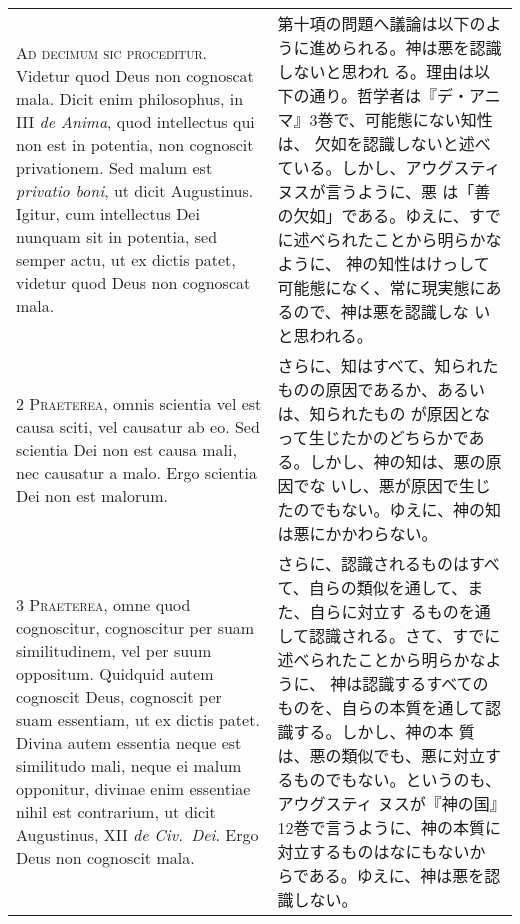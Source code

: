 \documentclass[10pt]{jsarticle} %
\begin{document}
\begin{longtable}{p{21em}p{21em}}



{\huge A}{\scshape d decimum sic proceditur}. Videtur quod Deus non
cognoscat mala. Dicit enim philosophus, in III {\itshape de Anima},
quod intellectus qui non est in potentia, non cognoscit
privationem. Sed malum est {\itshape privatio boni}, ut dicit
Augustinus. Igitur, cum intellectus Dei nunquam sit in potentia, sed
semper actu, ut ex dictis patet, videtur quod Deus non cognoscat mala.


&

第十項の問題へ議論は以下のように進められる。神は悪を認識しないと思われ
る。理由は以下の通り。哲学者は『デ・アニマ』3巻で、可能態にない知性は、
欠如を認識しないと述べている。しかし、アウグスティヌスが言うように、悪
は「善の欠如」である。ゆえに、すでに述べられたことから明らかなように、
神の知性はけっして可能態になく、常に現実態にあるので、神は悪を認識しな
いと思われる。

\\


{\scshape 2 Praeterea}, omnis scientia vel est causa sciti, vel
causatur ab eo. Sed scientia Dei non est causa mali, nec causatur a
malo. Ergo scientia Dei non est malorum.

&

さらに、知はすべて、知られたものの原因であるか、あるいは、知られたもの
が原因となって生じたかのどちらかである。しかし、神の知は、悪の原因でな
いし、悪が原因で生じたのでもない。ゆえに、神の知は悪にかかわらない。

\\


{\scshape 3 Praeterea}, omne quod cognoscitur, cognoscitur per suam
similitudinem, vel per suum oppositum. Quidquid autem cognoscit Deus,
cognoscit per suam essentiam, ut ex dictis patet. Divina autem
essentia neque est similitudo mali, neque ei malum opponitur, divinae
enim essentiae nihil est contrarium, ut dicit Augustinus, XII
{\itshape de Civ.~Dei}. Ergo Deus non cognoscit mala.

&

さらに、認識されるものはすべて、自らの類似を通して、また、自らに対立す
るものを通して認識される。さて、すでに述べられたことから明らかなように、
神は認識するすべてのものを、自らの本質を通して認識する。しかし、神の本
質は、悪の類似でも、悪に対立するものでもない。というのも、アウグスティ
ヌスが『神の国』12巻で言うように、神の本質に対立するものはなにもないか
らである。ゆえに、神は悪を認識しない。


\end{longtable}
\end{document}

